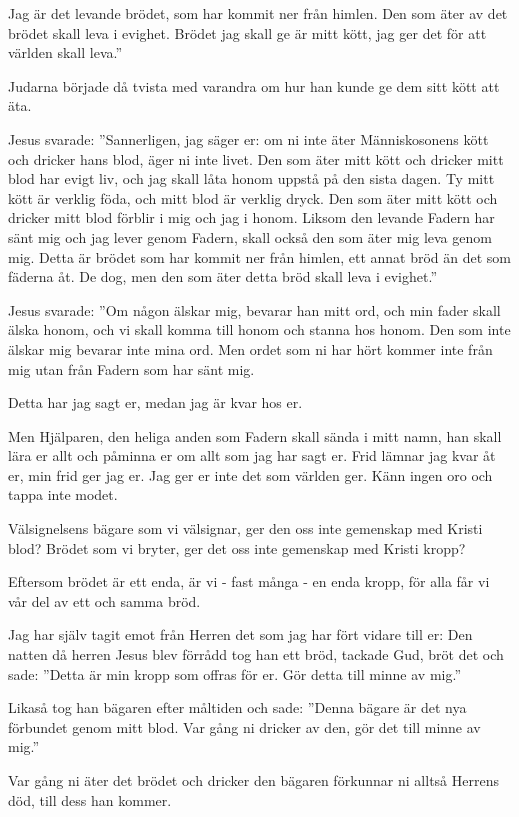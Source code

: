 {Jag är det levande brödet, som har kommit ner från himlen. Den som äter av det brödet skall leva i evighet. Brödet jag skall ge är mitt kött, jag ger det för att världen skall leva.”

Judarna började då tvista med varandra om hur han kunde ge dem sitt kött att äta.

Jesus svarade: ”Sannerligen, jag säger er: om ni inte äter Människosonens kött och dricker hans blod, äger ni inte livet.
Den som äter mitt kött och dricker mitt blod har evigt liv, och jag skall låta honom uppstå på den sista dagen.
Ty mitt kött är verklig föda, och mitt blod är verklig dryck.
Den som äter mitt kött och dricker mitt blod förblir i mig och jag i honom.
Liksom den levande Fadern har sänt mig och jag lever genom Fadern, skall också den som äter mig leva genom mig.
Detta är brödet som har kommit ner från himlen, ett annat bröd än det som fäderna åt. De dog, men den som äter detta bröd skall leva i evighet.”}



{Jesus svarade: ”Om någon älskar mig, bevarar han mitt ord, och min fader skall älska honom, och vi skall komma till honom och stanna hos honom.
Den som inte älskar mig bevarar inte mina ord. Men ordet som ni har hört kommer inte från mig utan från Fadern som har sänt mig.

Detta har jag sagt er, medan jag är kvar hos er.

Men Hjälparen, den heliga anden som Fadern skall sända i mitt namn, han skall lära er allt och påminna er om allt som jag har sagt er.
Frid lämnar jag kvar åt er, min frid ger jag er. Jag ger er inte det som världen ger. Känn ingen oro och tappa inte modet.}

{Välsignelsens bägare som vi välsignar, ger den oss inte gemenskap med Kristi blod? Brödet som vi bryter, ger det oss inte gemenskap med Kristi kropp?

Eftersom brödet är ett enda, är vi - fast många - en enda kropp, för alla får vi vår del av ett och samma bröd.}

{Jag har själv tagit emot från Herren det som jag har fört vidare till er: Den natten då herren Jesus blev förrådd tog han ett bröd,
tackade Gud, bröt det och sade: ”Detta är min kropp som offras för er. Gör detta till minne av mig.”

Likaså tog han bägaren efter måltiden och sade: ”Denna bägare är det nya förbundet genom mitt blod. Var gång ni dricker av den, gör det till minne av mig.”

Var gång ni äter det brödet och dricker den bägaren förkunnar ni alltså Herrens död, till dess han kommer.}


